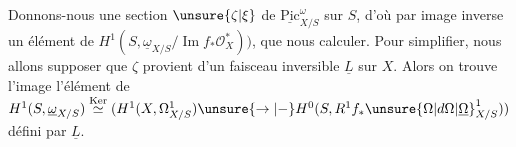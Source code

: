 Donnons-nous une section  $\unsure{\zeta|\xi}$ de $\underline{\mathrm{Pic}}_{X/S}^{\omega}$ sur $S$, d'où par image inverse un élément de $H^{1}(S,\underline{\omega}_{X/S}/\operatorname{Im}f_{*}\mathcal{O}_{X}^{*}))$, que nous  calculer. Pour simplifier, nous allons supposer que $\zeta$ provient d'un faisceau inversible $\underline{L}$ sur $X$. Alors on trouve l'image  l'élément de $H^{1}(S,\underline{\omega}_{X/S})\overset{\mathrm{Ker}}{\simeq}(H^{1}(X,\Omega^{1}_{X/S})\unsure{\to|-}H^{0}(S,R^{1}f_{*}\unsure{\Omega|d\Omega|\underline{\Omega}}^{1}_{X/S}))$ défini par $\underline{L}$.




